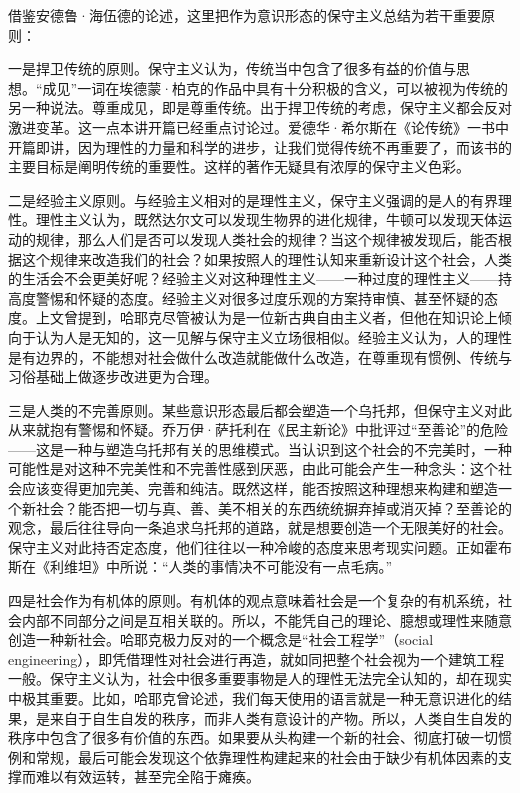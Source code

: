 借鉴安德鲁·海伍德的论述，这里把作为意识形态的保守主义总结为若干重要原则：

一是捍卫传统的原则。保守主义认为，传统当中包含了很多有益的价值与思想。“成见”一词在埃德蒙·柏克的作品中具有十分积极的含义，可以被视为传统的另一种说法。尊重成见，即是尊重传统。出于捍卫传统的考虑，保守主义都会反对激进变革。这一点本讲开篇已经重点讨论过。爱德华·希尔斯在《论传统》一书中开篇即讲，因为理性的力量和科学的进步，让我们觉得传统不再重要了，而该书的主要目标是阐明传统的重要性。这样的著作无疑具有浓厚的保守主义色彩。

二是经验主义原则。与经验主义相对的是理性主义，保守主义强调的是人的有界理性。理性主义认为，既然达尔文可以发现生物界的进化规律，牛顿可以发现天体运动的规律，那么人们是否可以发现人类社会的规律？当这个规律被发现后，能否根据这个规律来改造我们的社会？如果按照人的理性认知来重新设计这个社会，人类的生活会不会更美好呢？经验主义对这种理性主义——一种过度的理性主义——持高度警惕和怀疑的态度。经验主义对很多过度乐观的方案持审慎、甚至怀疑的态度。上文曾提到，哈耶克尽管被认为是一位新古典自由主义者，但他在知识论上倾向于认为人是无知的，这一见解与保守主义立场很相似。经验主义认为，人的理性是有边界的，不能想对社会做什么改造就能做什么改造，在尊重现有惯例、传统与习俗基础上做逐步改进更为合理。

三是人类的不完善原则。某些意识形态最后都会塑造一个乌托邦，但保守主义对此从来就抱有警惕和怀疑。乔万伊·萨托利在《民主新论》中批评过“至善论”的危险——这是一种与塑造乌托邦有关的思维模式。当认识到这个社会的不完美时，一种可能性是对这种不完美性和不完善性感到厌恶，由此可能会产生一种念头：这个社会应该变得更加完美、完善和纯洁。既然这样，能否按照这种理想来构建和塑造一个新社会？能否把一切与真、善、美不相关的东西统统摒弃掉或消灭掉？至善论的观念，最后往往导向一条追求乌托邦的道路，就是想要创造一个无限美好的社会。保守主义对此持否定态度，他们往往以一种冷峻的态度来思考现实问题。正如霍布斯在《利维坦》中所说：“人类的事情决不可能没有一点毛病。”

四是社会作为有机体的原则。有机体的观点意味着社会是一个复杂的有机系统，社会内部不同部分之间是互相关联的。所以，不能凭自己的理论、臆想或理性来随意创造一种新社会。哈耶克极力反对的一个概念是“社会工程学”（social engineering），即凭借理性对社会进行再造，就如同把整个社会视为一个建筑工程一般。保守主义认为，社会中很多重要事物是人的理性无法完全认知的，却在现实中极其重要。比如，哈耶克曾论述，我们每天使用的语言就是一种无意识进化的结果，是来自于自生自发的秩序，而非人类有意设计的产物。所以，人类自生自发的秩序中包含了很多有价值的东西。如果要从头构建一个新的社会、彻底打破一切惯例和常规，最后可能会发现这个依靠理性构建起来的社会由于缺少有机体因素的支撑而难以有效运转，甚至完全陷于瘫痪。

